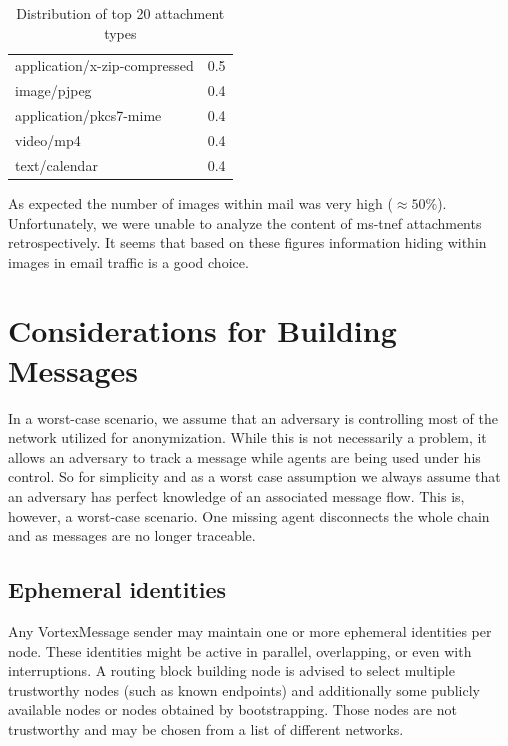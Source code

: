 \begin{table}[H]
\begin{tabular}{l|r}
		application/x-zip-compressed                                                &    0.5\\
		image/pjpeg                                                                 &    0.4\\
		application/pkcs7-mime                                                      &    0.4\\
		video/mp4                                                                   &    0.4\\
		text/calendar                                                               &    0.4\\\hline
	\end{tabular}
	\caption{Distribution of top 20 attachment types}
	\label{tab:emailAttachments}
\end{table}

As expected the number of images within mail was very high ($\approx 50\%$). Unfortunately, we were unable to analyze the content of ms-tnef attachments retrospectively. It seems that based on these figures information hiding within images in email traffic is a good choice.

\section{Considerations for Building Messages}
In a worst-case scenario, we assume that an adversary is controlling most of the network utilized for anonymization. While this is not necessarily a problem, it allows an adversary to track a message while agents are being used under his control. So for simplicity and as a worst case assumption we always assume that an adversary has perfect knowledge of an associated message flow. This is, however, a worst-case scenario. One missing agent disconnects the whole chain and as messages are no longer traceable.

\subsection{Ephemeral identities}
Any VortexMessage sender may maintain one or more ephemeral identities per node. These identities might be active in parallel, overlapping, or even with interruptions. A routing block building node is advised to select multiple trustworthy nodes (such as known endpoints) and additionally some publicly available nodes or nodes obtained by bootstrapping. Those nodes are not trustworthy and may be chosen from a list of different networks.

